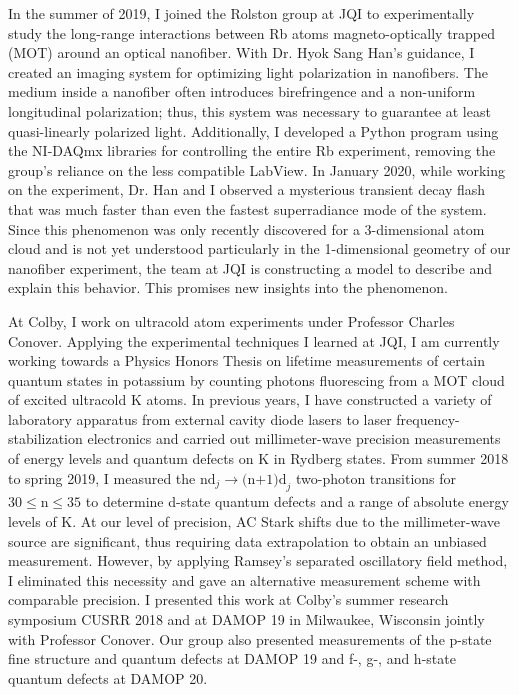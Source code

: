 \documentclass[12pt]{article}
\begin{document}
In the summer of 2019, I joined the Rolston group at JQI to experimentally study the long-range interactions between Rb atoms magneto-optically trapped (MOT) around an optical nanofiber. With Dr. Hyok Sang Han's guidance, I created an imaging system for optimizing light polarization in nanofibers. The medium inside a nanofiber often introduces birefringence and a non-uniform longitudinal polarization; thus, this system was necessary to guarantee at least  quasi-linearly polarized light. Additionally, I developed a Python program using the NI-DAQmx libraries for controlling the entire Rb experiment, removing the group's reliance on the less compatible LabView. In January 2020, while working on the experiment, Dr. Han and I observed a mysterious transient decay flash that was much faster than even the fastest superradiance mode of the system. Since this phenomenon was only recently discovered for a 3-dimensional atom cloud and is not yet understood particularly in the 1-dimensional geometry of our nanofiber experiment, the team at JQI is constructing a model to describe and explain this behavior. This promises new insights into the phenomenon.  \\ \vspace{-10pt}

At Colby, I work on ultracold atom experiments under Professor Charles Conover. Applying the experimental techniques I learned at JQI, I am currently working towards a Physics Honors Thesis on lifetime measurements of certain quantum states in potassium by counting photons fluorescing from a MOT cloud of excited ultracold K atoms. In previous years, I have constructed a variety of laboratory apparatus from external cavity diode lasers to laser frequency-stabilization electronics and carried out millimeter-wave precision measurements of energy levels and quantum defects on K in Rydberg states. From summer 2018 to spring 2019, I measured the $\mbox{nd}_{j} \to \mbox{(n+1)d}_{j}$ two-photon transitions for $\mbox{30} \leq \mbox{n} \leq \mbox{35}$ to determine d-state quantum defects and a range of absolute energy levels of K. At our level of precision, AC Stark shifts due to the millimeter-wave source are significant, thus requiring data extrapolation to obtain an unbiased measurement. However, by applying Ramsey's separated oscillatory field method, I eliminated this necessity and gave an alternative measurement scheme with comparable precision. I presented this work at Colby's summer research symposium CUSRR 2018 and at DAMOP 19 in Milwaukee, Wisconsin jointly with Professor Conover. Our group also presented measurements of the p-state fine structure and quantum defects at DAMOP 19 and f-, g-, and h-state quantum defects at DAMOP 20. \\ \vspace{-10pt}
\end{document}

